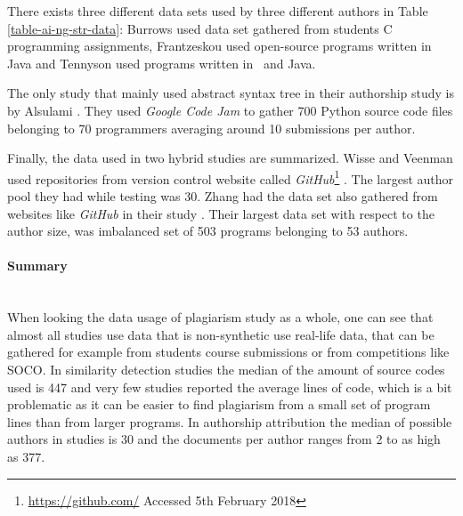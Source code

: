 \noindent
There exists three different data sets used by three different authors in Table \ref{table-ai-ng-str-data}: Burrows \etal \cite{SCANG2007, AIRTSCAA2009} used data set gathered from students C programming assignments, Frantzeskou \etal \cite{ESHPFSCAC2008, TSUDIJSCAI2011} used open-source programs written in Java and Tennyson \etal \cite{CAPSCAP2014, ABEC2014} used programs written in \cpp\, and Java.

The only study that mainly used abstract syntax tree in their authorship study is by Alsulami \etal \cite{SCAANN2017}. They used \emph{Google Code Jam} to gather 700 Python source code files belonging to 70 programmers averaging around 10 submissions per author. 

Finally, the data used in two hybrid studies are summarized. Wisse and Veenman used repositories from version control website called \emph{GitHub}\footnote{\url{https://github.com/} Accessed 5th February 2018} \cite{SDNAIJSP2015}. The largest author pool they had while testing was 30. Zhang \etal had the data set also gathered from websites like \emph{GitHub} in their study \cite{AISC2017}. Their largest data set with respect to the author size, was imbalanced set of 503 programs belonging to 53 authors. 

\paragraph{Summary}\mbox{}\\
When looking the data usage of plagiarism study as a whole, one can see that almost all studies use data that is non-synthetic \ie use real-life data, that can be gathered for example from students course submissions or from competitions like SOCO. In similarity detection studies the median of the amount of source codes used is 447 and very few studies reported the average lines of code, which is a bit problematic as it can be easier to find plagiarism from a small set of program lines than from larger programs. In authorship attribution the median of possible authors in studies is 30 and the documents per author ranges from 2 to as high as 377.

